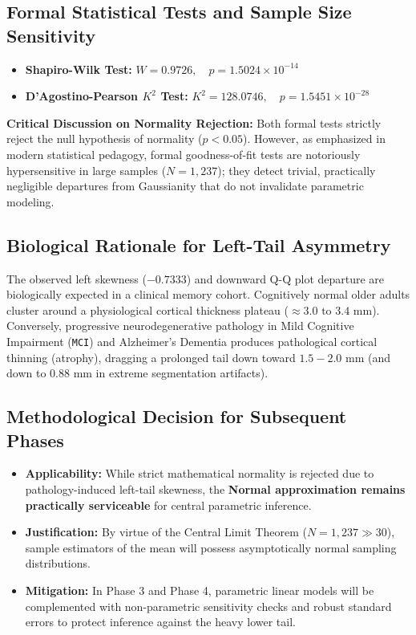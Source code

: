 \documentclass[11pt, a4paper]{article}
\begin{document}
\subsection{Formal Statistical Tests and Sample Size Sensitivity}
\begin{itemize}
    \item \textbf{Shapiro-Wilk Test:} $W = 0.9726, \quad p = 1.5024 \times 10^{-14}$
    \item \textbf{D'Agostino-Pearson $K^2$ Test:} $K^2 = 128.0746, \quad p = 1.5451 \times 10^{-28}$
\end{itemize}
\textbf{Critical Discussion on Normality Rejection:} Both formal tests strictly reject the null hypothesis of normality ($p < 0.05$). However, as emphasized in modern statistical pedagogy, formal goodness-of-fit tests are notoriously hypersensitive in large samples ($N = 1,237$); they detect trivial, practically negligible departures from Gaussianity that do not invalidate parametric modeling.

\subsection{Biological Rationale for Left-Tail Asymmetry}
The observed left skewness ($-0.7333$) and downward Q-Q plot departure are biologically expected in a clinical memory cohort. Cognitively normal older adults cluster around a physiological cortical thickness plateau ($\approx 3.0\text{ to } 3.4\text{ mm}$). Conversely, progressive neurodegenerative pathology in Mild Cognitive Impairment (\texttt{MCI}) and Alzheimer's Dementia produces pathological cortical thinning (atrophy), dragging a prolonged tail down toward $1.5 - 2.0\text{ mm}$ (and down to $0.88\text{ mm}$ in extreme segmentation artifacts).

\subsection{Methodological Decision for Subsequent Phases}
\begin{itemize}
    \item \textbf{Applicability:} While strict mathematical normality is rejected due to pathology-induced left-tail skewness, the \textbf{Normal approximation remains practically serviceable} for central parametric inference.
    \item \textbf{Justification:} By virtue of the Central Limit Theorem ($N = 1,237 \gg 30$), sample estimators of the mean will possess asymptotically normal sampling distributions.
    \item \textbf{Mitigation:} In Phase 3 and Phase 4, parametric linear models will be complemented with non-parametric sensitivity checks and robust standard errors to protect inference against the heavy lower tail.
\end{itemize}
\end{document}

